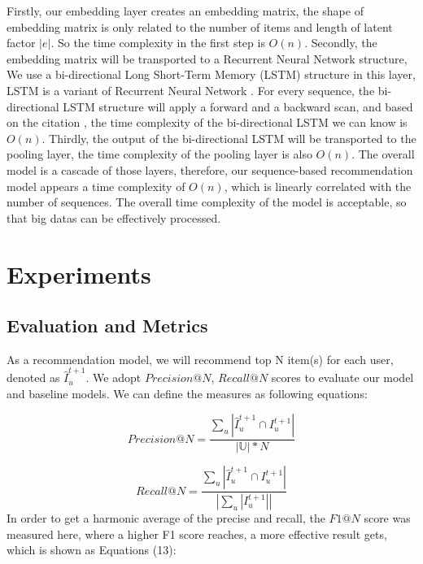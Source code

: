 \documentclass[runningheads]{llncs}
\begin{document}
Firstly, our embedding layer creates an embedding matrix, the shape of embedding matrix is only related to the number of items and length of latent factor $|e|$. So the time complexity in the first step is $O(n)$. Secondly, the embedding matrix will be transported to a Recurrent Neural Network structure, We use a bi-directional Long Short-Term Memory (LSTM) structure in this layer, LSTM is a variant of Recurrent Neural Network \cite{Lecun2015Deep}. For every sequence, the bi-directional LSTM structure will apply a forward and a backward scan, and based on the citation \cite{Sak2014Long}, the time complexity of the bi-directional LSTM we can know is $O(n)$. Thirdly, the output of the bi-directional LSTM will be transported to the pooling layer, the time complexity of the pooling layer is also $O(n)$. The overall model is a cascade of those layers, therefore, our sequence-based recommendation model appears a time complexity of $O(n)$\cite{Resnick:1994:GOA:192844.192905,sarwar2001item}, which is linearly correlated with the number of sequences. The overall time complexity of the model is acceptable, so that big datas can be effectively processed.


\section{Experiments}

\subsection{Evaluation and Metrics}

As a recommendation model, we will recommend top N item(s) for each user, denoted as $\hat{I}_{u}^{t+1}$. We adopt $Precision@N$, $Recall@N$ scores to evaluate our model and baseline models. We can define the measures as following equations:

\begin{equation}
Precision@N=\frac{\sum_{u}|\hat{I}_{u}^{t+1}\cap I_{u}^{t+1} |}{\left | \mathbb{U} \right |*N}
\end{equation}

\begin{equation}
Recall@N=\frac{\sum_{u}|\hat{I}_{u}^{t+1}\cap I_{u}^{t+1} |}{\left |\sum_{u}|I_{u}^{t+1}| \right |}
\end{equation}
In order to get a harmonic average of the precise and recall, the $F1@N$ score was measured here, where a higher F1 score reaches, a more effective result gets, which is shown as Equations (13):
\end{document}
